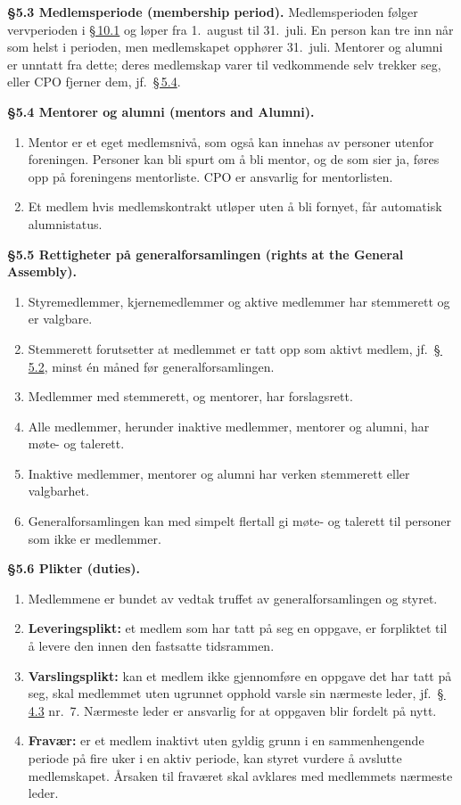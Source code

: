 \documentclass{../../../Common/Latex/Templates/rapport}
\begin{document}
\textbf{\S 5.3 Medlemsperiode (membership period).}\label{nbylaw:5.3} Medlemsperioden følger vervperioden i \hyperref[nbylaw:10.1]{\S\,10.1} og løper fra 1.\ august til 31.\ juli. En person kan tre inn n\r{a}r som helst i perioden, men medlemskapet opphører 31.\ juli. Mentorer og alumni er unntatt fra dette; deres medlemskap varer til vedkommende selv trekker seg, eller CPO fjerner dem, jf.\ \hyperref[nbylaw:5.4]{\S\,5.4}.

\textbf{\S 5.4 Mentorer og alumni (mentors and Alumni).}\label{nbylaw:5.4}
\begin{enumerate}
  \item Mentor er et eget medlemsniv\r{a}, som ogs\r{a} kan innehas av personer utenfor foreningen. Personer kan bli spurt om \r{a} bli mentor, og de som sier ja, føres opp p\r{a} foreningens mentorliste. CPO er ansvarlig for mentorlisten.
  \item Et medlem hvis medlemskontrakt utløper uten \r{a} bli fornyet, f\r{a}r automatisk alumnistatus.
\end{enumerate}

\textbf{\S 5.5 Rettigheter p\r{a} generalforsamlingen (rights at the General Assembly).}\label{nbylaw:5.5}
\begin{enumerate}
  \item Styremedlemmer, kjernemedlemmer og aktive medlemmer har stemmerett og er valgbare.
  \item Stemmerett forutsetter at medlemmet er tatt opp som aktivt medlem, jf.\ \hyperref[nbylaw:5.2]{\S\,5.2}, minst \'en m\r{a}ned før generalforsamlingen.
  \item Medlemmer med stemmerett, og mentorer, har forslagsrett.
  \item Alle medlemmer, herunder inaktive medlemmer, mentorer og alumni, har møte- og talerett.
  \item Inaktive medlemmer, mentorer og alumni har verken stemmerett eller valgbarhet.
  \item Generalforsamlingen kan med simpelt flertall gi møte- og talerett til personer som ikke er medlemmer.
\end{enumerate}

\textbf{\S 5.6 Plikter (duties).}\label{nbylaw:5.6}
\begin{enumerate}
  \item Medlemmene er bundet av vedtak truffet av generalforsamlingen og styret.
  \item \textbf{Leveringsplikt:} et medlem som har tatt p\r{a} seg en oppgave, er forpliktet til \r{a} levere den innen den fastsatte tidsrammen.
  \item \textbf{Varslingsplikt:} kan et medlem ikke gjennomføre en oppgave det har tatt p\r{a} seg, skal medlemmet uten ugrunnet opphold varsle sin nærmeste leder, jf.\ \hyperref[nbylaw:4.3]{\S\,4.3} nr.\ 7. Nærmeste leder er ansvarlig for at oppgaven blir fordelt p\r{a} nytt.
  \item \textbf{Fravær:} er et medlem inaktivt uten gyldig grunn i en sammenhengende periode p\r{a} fire uker i en aktiv periode, kan styret vurdere \r{a} avslutte medlemskapet. \r{A}rsaken til fraværet skal avklares med medlemmets nærmeste leder.
\end{enumerate}
\end{document}
